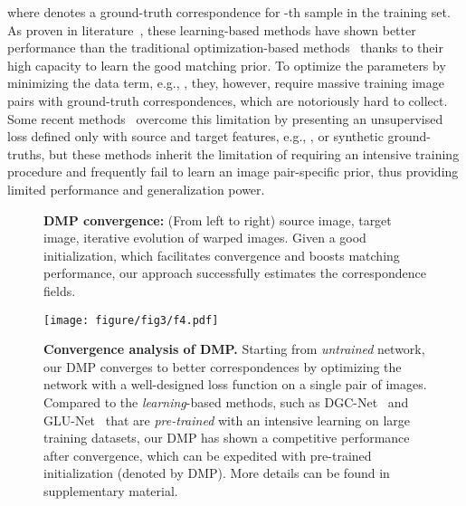 \documentclass[10pt,twocolumn,letterpaper]{article}
\begin{document}
where  denotes a ground-truth correspondence for -th sample in the training set. As proven in literature~\cite{melekhov2019dgc,truong2020glu}, these learning-based methods have shown better performance than the traditional optimization-based methods~\cite{liu2010sift,ham2016proposal,kim2017dctm} thanks to their high capacity to learn the good matching prior. To optimize the parameters by minimizing the data term, e.g., , they, however, require massive training image pairs with ground-truth correspondences, which are notoriously hard to collect. Some recent methods~\cite{rocco2017convolutional,shen2020ransac} overcome this limitation by presenting an unsupervised loss defined only with source and target features, e.g., , or synthetic ground-truths, but these methods inherit the limitation of requiring an intensive training procedure and frequently fail to learn an image pair-specific prior, thus providing limited performance and generalization power.
\begin{figure*}[t]
		\centering
		\renewcommand{\thesubfigure}{}
\hfill
		\hfill
		\hfill
		\hfill
		\hfill
		\hfill
		\hfill
		\hfill
		\vspace{-10pt}
		\caption{\textbf{DMP convergence:} (From left to right) source image, target image, iterative evolution of warped images. Given a good initialization, which facilitates convergence and boosts matching performance, our approach successfully estimates the correspondence fields.}\vspace{-10pt}\label{img:3}
\end{figure*}

\begin{figure}
	\centering
\texttt{[image: figure/fig3/f4.pdf]}
  \caption{\textbf{Convergence analysis of DMP.} Starting from \emph{untrained} network, our DMP converges to better correspondences by optimizing the network with a well-designed loss function on a single pair of images. Compared to the \emph{learning}-based methods, such as DGC-Net~\cite{melekhov2019dgc} and GLU-Net~\cite{truong2020glu} that are \emph{pre-trained} with an intensive learning on large training datasets, our DMP has shown a competitive performance after convergence, which can be expedited with pre-trained initialization (denoted by DMP). More details can be found in supplementary material.}\vspace{-15pt}\label{img:4}
\end{figure}
\end{document}
